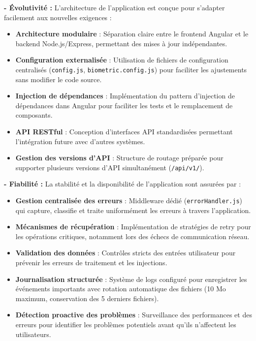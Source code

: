 \textbf{- Évolutivité :} L'architecture de l'application est conçue pour s'adapter facilement aux nouvelles exigences :
\begin{itemize}[label=$\circ$]
  \item \textbf{Architecture modulaire} : Séparation claire entre le frontend Angular et le backend Node.js/Express, permettant des mises à jour indépendantes.
  \item \textbf{Configuration externalisée} : Utilisation de fichiers de configuration centralisés (\texttt{config.js}, \texttt{biometric.config.js}) pour faciliter les ajustements sans modifier le code source.
  \item \textbf{Injection de dépendances} : Implémentation du pattern d'injection de dépendances dans Angular pour faciliter les tests et le remplacement de composants.
  \item \textbf{API RESTful} : Conception d'interfaces API standardisées permettant l'intégration future avec d'autres systèmes.
  \item \textbf{Gestion des versions d'API} : Structure de routage préparée pour supporter plusieurs versions d'API simultanément (\texttt{/api/v1/}).
\end{itemize}

\textbf{- Fiabilité :} La stabilité et la disponibilité de l'application sont assurées par :
\begin{itemize}[label=$\circ$]
  \item \textbf{Gestion centralisée des erreurs} : Middleware dédié (\texttt{errorHandler.js}) qui capture, classifie et traite uniformément les erreurs à travers l'application.
  \item \textbf{Mécanismes de récupération} : Implémentation de stratégies de retry pour les opérations critiques, notamment lors des échecs de communication réseau.
  \item \textbf{Validation des données} : Contrôles stricts des entrées utilisateur pour prévenir les erreurs de traitement et les injections.
  \item \textbf{Journalisation structurée} : Système de logs configuré pour enregistrer les événements importants avec rotation automatique des fichiers (10 Mo maximum, conservation des 5 derniers fichiers).
  \item \textbf{Détection proactive des problèmes} : Surveillance des performances et des erreurs pour identifier les problèmes potentiels avant qu'ils n'affectent les utilisateurs.
\end{itemize}

